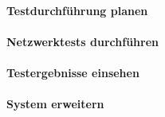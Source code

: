 \documentclass[]{subfiles}
\begin{document}
        \paragraph{Testdurchführung planen}

        \paragraph{Netzwerktests durchführen}

        \paragraph{Testergebnisse einsehen}

        \paragraph{System erweitern}
\end{document}
